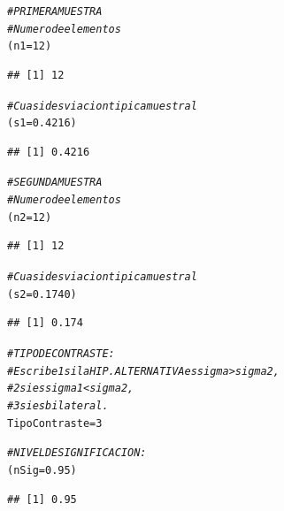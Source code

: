 \documentclass[10pt,a4paper]{article}\usepackage[]{graphicx}\usepackage[]{color}
\makeatletter
\newcommand{\hlnum}[1]{\textcolor[rgb]{0.686,0.059,0.569}{#1}}%
\newcommand{\hlcom}[1]{\textcolor[rgb]{0.678,0.584,0.686}{\textit{#1}}}%
\newcommand{\hlstd}[1]{\textcolor[rgb]{0.345,0.345,0.345}{#1}}%
\newcommand{\hlkwb}[1]{\textcolor[rgb]{0.69,0.353,0.396}{#1}}%
\newenvironment{kframe}{%
 \def\at@end@of@kframe{}%
 \ifinner\ifhmode%
  \def\at@end@of@kframe{\end{minipage}}%
  \begin{minipage}{\columnwidth}%
 \fi\fi%
 \def\FrameCommand##1{\hskip\@totalleftmargin \hskip-\fboxsep
 \colorbox{shadecolor}{##1}\hskip-\fboxsep
     \hskip-\linewidth \hskip-\@totalleftmargin \hskip\columnwidth}%
 \MakeFramed {\advance\hsize-\width
   \@totalleftmargin\z@ \linewidth\hsize
   \@setminipage}}%
 {\par\unskip\endMakeFramed%
 \at@end@of@kframe}
\newenvironment{knitrout}{}{} %
\makeatother
\begin{document}
\begin{knitrout}
\color{fgcolor}\begin{kframe}
\begin{alltt}
 \hlcom{# PRIMERA MUESTRA}
 \hlcom{# Numero de elementos}
 \hlstd{(n1} \hlkwb{=} \hlnum{12}\hlstd{)}
\end{alltt}
\begin{verbatim}
## [1] 12
\end{verbatim}
\begin{alltt}
 \hlcom{# Cuasidesviacion tipica muestral}
 \hlstd{(s1} \hlkwb{=} \hlnum{0.4216}\hlstd{)}
\end{alltt}
\begin{verbatim}
## [1] 0.4216
\end{verbatim}
\begin{alltt}
 \hlcom{# SEGUNDA MUESTRA}
 \hlcom{# Numero de elementos}
 \hlstd{(n2} \hlkwb{=} \hlnum{12}\hlstd{)}
\end{alltt}
\begin{verbatim}
## [1] 12
\end{verbatim}
\begin{alltt}
 \hlcom{# Cuasidesviacion tipica  muestral}
 \hlstd{(s2} \hlkwb{=} \hlnum{0.1740}\hlstd{)}
\end{alltt}
\begin{verbatim}
## [1] 0.174
\end{verbatim}
\begin{alltt}
 \hlcom{# TIPO DE CONTRASTE:}
 \hlcom{# Escribe 1 si la HIP. ALTERNATIVA es sigma > sigma2,}
 \hlcom{#         2 si es sigma1 < sigma2,}
 \hlcom{#         3 si es bilateral.}
 \hlstd{TipoContraste} \hlkwb{=} \hlnum{3}

 \hlcom{#NIVEL DE SIGNIFICACION:}
 \hlstd{(nSig} \hlkwb{=} \hlnum{0.95}\hlstd{)}
\end{alltt}
\begin{verbatim}
## [1] 0.95
\end{verbatim}
\end{kframe}
\end{knitrout}
\end{document}
